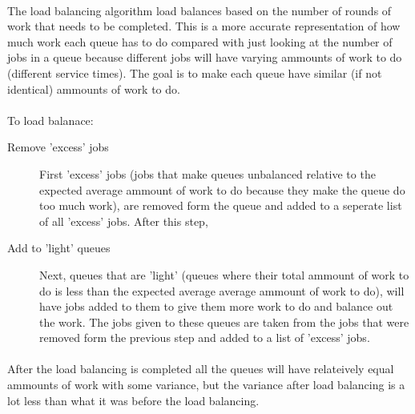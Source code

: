 \documentclass[12pt]{article}
\begin{document}
\paragraph{} The load balancing algorithm load balances based on the number of rounds of work that needs to be completed. This is a more accurate representation of how much work each queue has to do compared with just looking at the number of jobs in a queue because different jobs will have varying ammounts of work to do (different service times). The goal is to make each queue have similar (if not identical) ammounts of work to do.

\paragraph{} To load balanace:
\begin{description}
  \item [Remove 'excess' jobs] First 'excess' jobs (jobs that make queues unbalanced relative to the expected average ammount of work to do because they make the queue do too much work), are removed form the queue and added to a seperate list of all 'excess' jobs. After this step,
  \item [Add to 'light' queues] Next, queues that are 'light' (queues where their total ammount of work to do is less than the expected average average ammount of work to do), will have jobs added to them to give them more work to do and balance out the work. The jobs given to these queues are taken from the jobs that were removed form the previous step and added to a list of 'excess' jobs.
\end{description}
\paragraph{} After the load balancing is completed all the queues will have relateively equal ammounts of work with some variance, but the variance after load balancing is a lot less than what it was before the load balancing.
\end{document}
